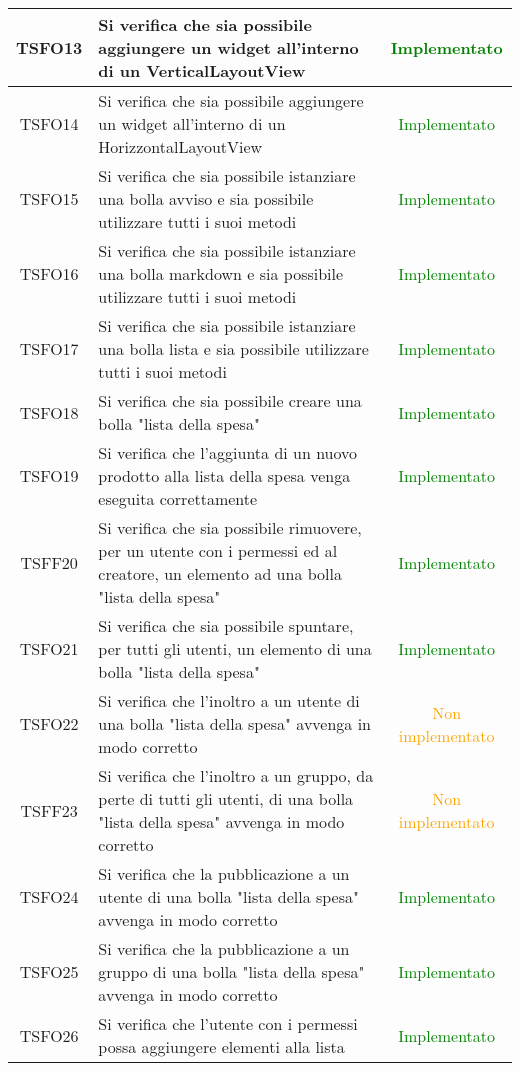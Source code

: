 \begin{center}
\begin{longtable}{|c|>{\centering}m{10cm}|c|}
		TSFO13 & Si verifica che sia possibile aggiungere un widget all'interno di un VerticalLayoutView & \textcolor{Green}{Implementato}\\ \hline
		TSFO14 & Si verifica che sia possibile aggiungere un widget all'interno di un HorizzontalLayoutView & \textcolor{Green}{Implementato}\\ \hline
		TSFO15 & Si verifica che sia possibile istanziare una bolla avviso e sia possibile utilizzare tutti i suoi metodi & \textcolor{Green}{Implementato}\\ \hline
		TSFO16 & Si verifica che sia possibile istanziare una bolla markdown e sia possibile utilizzare tutti i suoi metodi & \textcolor{Green}{Implementato}\\ \hline
		TSFO17 & Si verifica che sia possibile istanziare una bolla lista e sia possibile utilizzare tutti i suoi metodi & \textcolor{Green}{Implementato}\\ \hline
		TSFO18 & Si verifica che sia possibile creare una bolla "lista della spesa" & \textcolor{Green}{Implementato}\\ \hline
		TSFO19 & Si verifica che l'aggiunta di un nuovo prodotto alla lista della spesa venga eseguita correttamente & \textcolor{Green}{Implementato}\\ \hline
		TSFF20 & Si verifica che sia possibile rimuovere, per un utente con i permessi ed al creatore, un elemento ad una bolla "lista della spesa" & \textcolor{Green}{Implementato}\\ \hline
		TSFO21 & Si verifica che sia possibile spuntare, per tutti gli utenti, un elemento di una bolla "lista della spesa" & \textcolor{Green}{Implementato}\\ \hline
		TSFO22 & Si verifica che l'inoltro a un utente di una bolla "lista della spesa" avvenga in modo corretto & \textcolor{Orange}{Non implementato}\\ \hline
		TSFF23 & Si verifica che l'inoltro a un gruppo, da perte di tutti gli utenti, di una bolla "lista della spesa" avvenga in modo corretto & \textcolor{Orange}{Non implementato}\\ \hline
		TSFO24 & Si verifica che la pubblicazione a un utente di una bolla "lista della spesa" avvenga in modo corretto & \textcolor{Green}{Implementato}\\ \hline
		TSFO25 & Si verifica che la pubblicazione a un gruppo di una bolla "lista della spesa" avvenga in modo corretto & \textcolor{Green}{Implementato}\\ \hline
		TSFO26 & Si verifica che l'utente con i permessi possa aggiungere elementi alla lista & \textcolor{Green}{Implementato}\\ \hline

\end{longtable}
\end{center}
